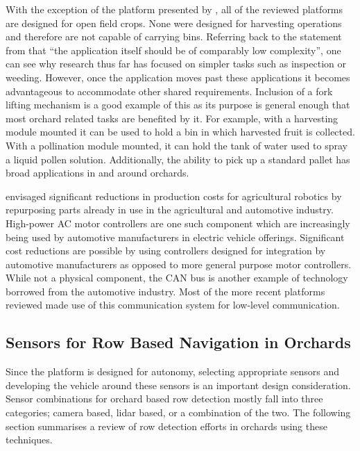 \documentclass[preprint,authoryear,12pt]{elsarticle}
\begin{document}
        With the exception of the platform presented by \cite{Scarfe2012}, all of the reviewed platforms are designed for open field crops.
        None were designed for harvesting operations and therefore are not capable of carrying bins.
        Referring back to the statement from \cite{Ruckelshausen2009} that ``the application itself should be of comparably low complexity'', one can see why research thus far has focused on simpler tasks such as inspection or weeding.
        However, once the application moves past these applications it becomes advantageous to accommodate other shared requirements.
        Inclusion of a fork lifting mechanism is a good example of this as its purpose is general enough that most orchard related tasks are benefited by it.
        For example, with a harvesting module mounted it can be used to hold a bin in which harvested fruit is collected.
        With a pollination module mounted, it can hold the tank of water used to spray a liquid pollen solution.
        Additionally, the ability to pick up a standard pallet has broad applications in and around orchards.

        \cite{Blackmore2007} envisaged significant reductions in production costs for agricultural robotics by repurposing parts already in use in the agricultural and automotive industry.
        High-power AC motor controllers are one such component which are increasingly being used by automotive manufacturers in electric vehicle offerings.
        Significant cost reductions are possible by using controllers designed for integration by automotive manufacturers as opposed to more general purpose motor controllers.
        While not a physical component, the CAN bus is another example of technology borrowed from the automotive industry.
        Most of the more recent platforms reviewed made use of this communication system for low-level communication.

    \subsection{Sensors for Row Based Navigation in Orchards}

        Since the platform is designed for autonomy, selecting appropriate sensors and developing the vehicle around these sensors is an important design consideration.
        Sensor combinations for orchard based row detection mostly fall into three categories; camera based, lidar based, or a combination of the two.
        The following section summarises a review of row detection efforts in orchards using these techniques.
\end{document}
